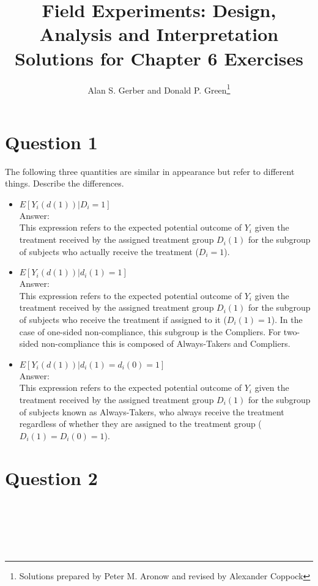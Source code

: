 \documentclass[11pt,notitlepage]{article}\usepackage[]{graphicx}\usepackage[]{color}
\title{Field Experiments: Design, Analysis and Interpretation \\
Solutions for Chapter 6 Exercises}
\author{Alan S. Gerber and Donald P. Green\footnote{Solutions prepared by Peter M. Aronow and revised by Alexander Coppock}}
\date{\vspace{-5ex}}
\makeatletter
\newenvironment{kframe}{%
 \def\at@end@of@kframe{}%
 \ifinner\ifhmode%
  \def\at@end@of@kframe{\end{minipage}}%
  \begin{minipage}{\columnwidth}%
 \fi\fi%
 \def\FrameCommand##1{\hskip\@totalleftmargin \hskip-\fboxsep
 \colorbox{shadecolor}{##1}\hskip-\fboxsep
     \hskip-\linewidth \hskip-\@totalleftmargin \hskip\columnwidth}%
 \MakeFramed {\advance\hsize-\width
   \@totalleftmargin\z@ \linewidth\hsize
   \@setminipage}}%
 {\par\unskip\endMakeFramed%
 \at@end@of@kframe}
\newenvironment{knitrout}{}{} %
\makeatother
\begin{document}
\maketitle


\section*{Question 1}
The following three quantities are similar in appearance but refer to different things. Describe the differences.
\begin{itemize}
\item $E[Y_i(d(1))|D_i = 1]$ \\
Answer:\\
This expression refers to the expected potential outcome of $Y_i$ given the treatment received by the assigned treatment group $D_i(1)$ for the subgroup of subjects who actually receive the treatment ($D_i=1$).
\item $E[Y_i(d(1))|d_i(1) = 1]$ \\
Answer:\\
This expression refers to the expected potential outcome of $Y_i$ given the treatment received by the assigned treatment group $D_i(1)$ for the subgroup of subjects who receive the treatment if assigned to it ($D_i(1)=1$). In the case of one-sided non-compliance, this subgroup is the Compliers. For two-sided non-compliance this is composed of Always-Takers and Compliers.
\item $E[Y_i(d(1))|d_i(1) = d_i(0) = 1]$\\
Answer:\\
This expression refers to the expected potential outcome of $Y_i$ given the treatment received by the assigned treatment group $D_i (1)$ for the subgroup of subjects known as Always-Takers, who always receive the treatment regardless of whether they are assigned to the treatment group ($D_i (1)=D_i (0)=1$). 

\end{itemize}

\section*{Question 2}
\begin{knitrout}
\color{fgcolor}\begin{kframe}
\begin{verbatim}






\end{verbatim}
\end{kframe}
\end{knitrout}
\end{document}
